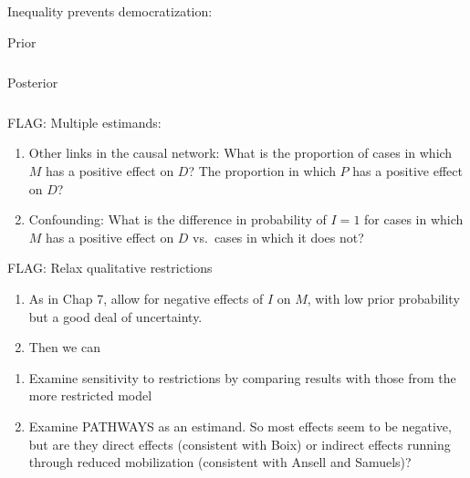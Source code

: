 \documentclass[12pt,]{book}
\begin{document}
Inequality prevents democratization:

\begin{table}[t]

\caption{\label{tab:IpreventsDem}Prior}
\centering
\begin{tabular}{}
\hline

\hline
\end{tabular}
\end{table}

\begin{table}[t]

\caption{\label{tab:IpreventsDem}Posterior}
\centering
\begin{tabular}{}
\hline

\hline
\end{tabular}
\end{table}

FLAG: Multiple estimands:

\begin{enumerate}
\def\labelenumi{\arabic{enumi}.}
\item
  Other links in the causal network: What is the proportion of cases in which \(M\) has a positive effect on \(D\)? The proportion in which \(P\) has a positive effect on \(D\)?
\item
  Confounding: What is the difference in probability of \(I=1\) for cases in which \(M\) has a positive effect on \(D\) vs.~cases in which it does not?
\end{enumerate}

FLAG: Relax qualitative restrictions

\begin{enumerate}
\def\labelenumi{\arabic{enumi}.}
\item
  As in Chap 7, allow for negative effects of \(I\) on \(M\), with low prior probability but a good deal of uncertainty.
\item
  Then we can
\end{enumerate}

\begin{enumerate}
\def\labelenumi{(\alph{enumi})}
\item
  Examine sensitivity to restrictions by comparing results with those from the more restricted model
\item
  Examine PATHWAYS as an estimand. So most effects seem to be negative, but are they direct effects (consistent with Boix) or indirect effects running through reduced mobilization (consistent with Ansell and Samuels)?
\end{enumerate}
\end{document}
